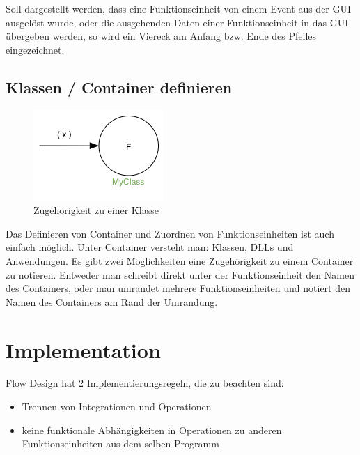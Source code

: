 Soll dargestellt werden, dass eine Funktionseinheit von einem Event aus der GUI ausgelöst
wurde, oder die ausgehenden Daten einer Funktionseinheit in das GUI übergeben werden, so
wird ein Viereck am Anfang bzw. Ende des Pfeiles eingezeichnet.

\section{Klassen / Container definieren}


\begin{figure}[!htbp]
	\centering
	\includegraphics[width=.4\linewidth]{./img/diagramClass.png}
	\caption{Zugehörigkeit zu einer Klasse}
\end{figure}


Das Definieren von Container und Zuordnen von Funktionseinheiten ist auch
einfach möglich. Unter Container versteht man: Klassen, DLLs und Anwendungen.
Es gibt zwei Möglichkeiten eine Zugehörigkeit zu einem Container zu notieren.
Entweder man schreibt direkt unter der Funktionseinheit den Namen des
Containers, oder man umrandet mehrere Funktionseinheiten und notiert den Namen
des Containers am Rand der Umrandung.



\chapter{Implementation}


Flow Design hat 2 Implementierungsregeln, die zu beachten sind:

\begin{itemize}
\item Trennen von Integrationen und Operationen
\item keine funktionale Abhängigkeiten in Operationen zu anderen Funktionseinheiten aus dem selben Programm
\end{itemize}


